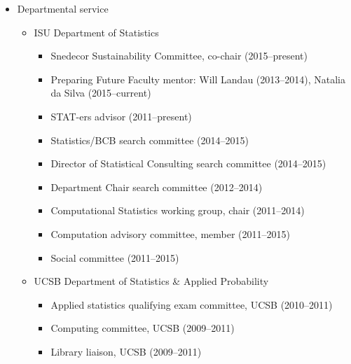 \documentclass[overlapped,line]{res}
\begin{document}
\begin{resume}
\begin{itemize}
\item Departmental service
 	\begin{itemize}
	\item ISU Department of Statistics 
		\begin{itemize}
    \item Snedecor Sustainability Committee, co-chair (2015--present)
  	\item Preparing Future Faculty mentor: Will Landau (2013--2014), Natalia da Silva (2015--current)
  	\item STAT-ers advisor (2011--present)
		\item Statistics/BCB search committee (2014--2015)
		\item Director of Statistical Consulting search committee (2014--2015)
		\item Department Chair search committee (2012--2014)
		\item Computational Statistics working group, chair (2011--2014)
		\item Computation advisory committee, member (2011--2015)
		\item Social committee (2011--2015)
		\end{itemize}
	\item UCSB Department of Statistics \& Applied Probability
		\begin{itemize}
		\item Applied statistics qualifying exam committee, UCSB (2010--2011)
		\item Computing committee, UCSB (2009--2011)
		\item Library liaison, UCSB (2009--2011)
		\end{itemize}
 	\end{itemize}
\end{itemize}




{\small
      \begin{center}
		
		\end{center}

	    \begin{center}
		
		\end{center}
}



\end{resume}
\end{document}

